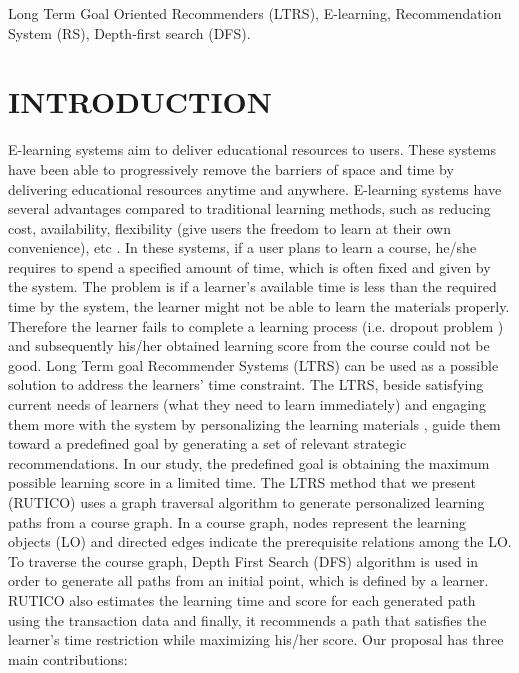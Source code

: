 \documentclass{sig-alternate}
\begin{document}
\begin{flushleft}
\printccsdesc
\end{flushleft}

\begin{keywords}
 Long Term Goal Oriented Recommenders (LTRS), E-learning, Recommendation System (RS), Depth-first search (DFS).
\end{keywords}
\section{INTRODUCTION}
\label{sec:introduction}
\noindent E-learning systems aim to deliver educational resources to users. These systems have been able to progressively remove the barriers of space and time by delivering educational resources anytime and anywhere. E-learning systems have several advantages compared to traditional learning methods, such as reducing cost, availability, flexibility (give users the freedom to learn at their own convenience), etc \cite{dargham2012learning}. In these systems, if a user plans to learn a course, he/she requires to spend a specified amount of time, which is often fixed and given by the system. The problem is if a learner’s available time is less than the required time by the system, the learner might not be able to learn the materials properly. Therefore the learner fails to complete a learning process (i.e. dropout problem \cite{crawford2013community}) and subsequently his/her obtained learning score from the course could not be good. Long Term goal Recommender Systems (LTRS) \cite{nabizadeh2015long} can be used as a possible solution to address the learners’ time constraint. The LTRS, beside satisfying current needs of learners (what they need to learn immediately) and engaging them more with the system by personalizing the learning materials , guide them toward a predefined goal by generating a set of relevant strategic recommendations. In our study, the predefined goal is obtaining the maximum possible learning score in a limited time. The LTRS method that we present (RUTICO) uses a graph traversal algorithm to generate personalized learning paths from a course graph. In a course graph, nodes represent the learning objects (LO) and directed edges indicate the prerequisite relations among the LO. To traverse the course graph, Depth First Search (DFS) algorithm
\cite{tarjan1972depth} is used in order to generate all paths from an initial point, which is defined by a learner. RUTICO also estimates the learning time and score for each generated path using the transaction data and finally, it recommends a path that satisfies the learner’s time restriction while maximizing his/her score. Our proposal has three main contributions:
\end{document}
